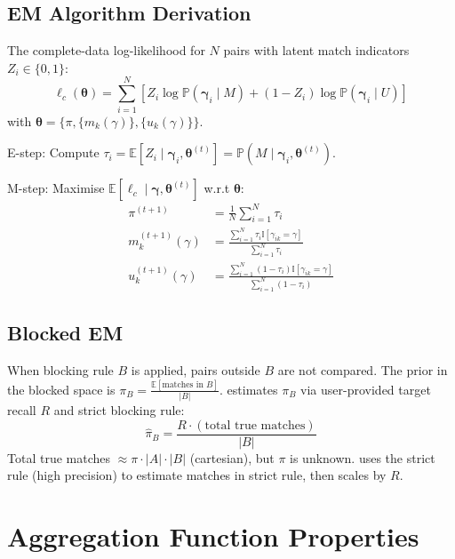 \subsection{EM Algorithm Derivation}
\label{annex:em_derivation}
The complete-data log-likelihood for $N$ pairs with latent match indicators $Z_i \in \{0,1\}$:
\begin{equation}
	\ell_c(\boldsymbol{\theta}) = \sum_{i=1}^N \left[ Z_i \log \mathbb{P}(\boldsymbol{\gamma}_i \mid M) + (1-Z_i) \log \mathbb{P}(\boldsymbol{\gamma}_i \mid U) \right]
\end{equation}
with $\boldsymbol{\theta} = \{ \pi, \{m_k(\gamma)\}, \{u_k(\gamma)\} \}$.

E-step: Compute $\tau_i = \mathbb{E}[Z_i \mid \boldsymbol{\gamma}_i, \boldsymbol{\theta}^{(t)}] = \mathbb{P}(M \mid \boldsymbol{\gamma}_i, \boldsymbol{\theta}^{(t)})$.

M-step: Maximise $\mathbb{E}[\ell_c \mid \boldsymbol{\gamma}, \boldsymbol{\theta}^{(t)}]$ w.r.t $\boldsymbol{\theta}$:
\begin{align}
	\pi^{(t+1)}         & = \frac{1}{N} \sum_{i=1}^N \tau_i                                                          \\
	m_k^{(t+1)}(\gamma) & = \frac{\sum_{i=1}^N \tau_i \mathbb{I}[\gamma_{ik} = \gamma]}{\sum_{i=1}^N \tau_i}         \\
	u_k^{(t+1)}(\gamma) & = \frac{\sum_{i=1}^N (1-\tau_i) \mathbb{I}[\gamma_{ik} = \gamma]}{\sum_{i=1}^N (1-\tau_i)}
\end{align}

\subsection{Blocked EM}
When blocking rule $B$ is applied, pairs outside $B$ are not compared.
The prior in the blocked space is $\pi_B = \frac{\mathbb{E}[\text{matches in } B]}{|B|}$.
\splink{} estimates $\pi_B$ via user-provided target recall $R$ and strict blocking rule:
\begin{equation}
	\hat{\pi}_B = \frac{R \cdot (\text{total true matches})}{|B|}
\end{equation}
Total true matches $\approx \pi \cdot |A| \cdot |B|$ (cartesian), but $\pi$ is unknown.
\splink{} uses the strict rule (high precision) to estimate matches in strict rule, then scales by $R$.

\section{Aggregation Function Properties}
\label{annex:agg_properties}

